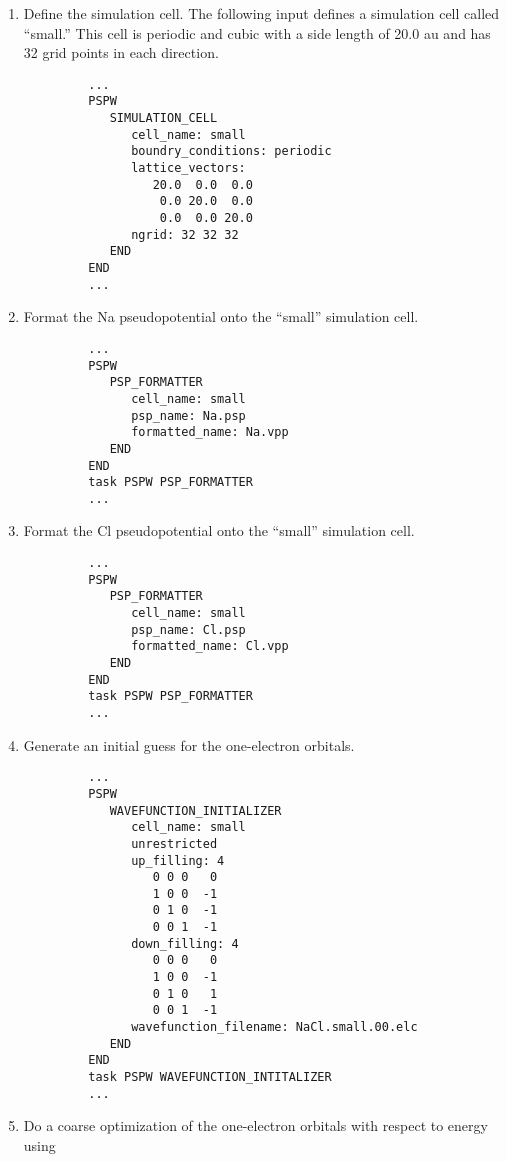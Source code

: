 \begin{enumerate}
\item Define the simulation cell.  
      The following input defines a simulation cell called ``small.'' This
      cell is periodic and cubic with a side length of 20.0 au and has
      32 grid points in each direction.  
\tiny   \begin{verbatim}
         ...
         PSPW
            SIMULATION_CELL
               cell_name: small
               boundry_conditions: periodic
               lattice_vectors:
                  20.0  0.0  0.0 
                   0.0 20.0  0.0 
                   0.0  0.0 20.0 
               ngrid: 32 32 32
            END
         END
         ...
   \end{verbatim}
\normalsize
\item Format the Na pseudopotential onto the ``small'' simulation cell.
\tiny   \begin{verbatim}
         ...
         PSPW
            PSP_FORMATTER
               cell_name: small
               psp_name: Na.psp
               formatted_name: Na.vpp
            END
         END
         task PSPW PSP_FORMATTER
         ...
   \end{verbatim}
\normalsize
\item Format the Cl pseudopotential onto the ``small'' simulation cell.
\tiny   \begin{verbatim}
         ...
         PSPW
            PSP_FORMATTER
               cell_name: small
               psp_name: Cl.psp
               formatted_name: Cl.vpp
            END
         END
         task PSPW PSP_FORMATTER
         ...
   \end{verbatim}
\normalsize
\item Generate an initial guess for the one-electron orbitals.
\tiny   \begin{verbatim}
         ...
         PSPW
            WAVEFUNCTION_INITIALIZER
               cell_name: small
               unrestricted
               up_filling: 4
                  0 0 0   0 
                  1 0 0  -1
                  0 1 0  -1
                  0 0 1  -1
               down_filling: 4
                  0 0 0   0
                  1 0 0  -1
                  0 1 0   1
                  0 0 1  -1
               wavefunction_filename: NaCl.small.00.elc
            END
         END
         task PSPW WAVEFUNCTION_INTITALIZER
         ...
   \end{verbatim}
\normalsize
\item Do a coarse optimization of the one-electron orbitals with respect to energy using

\end{enumerate}
